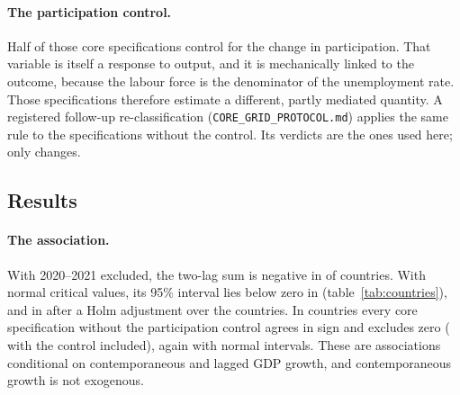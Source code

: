 \paragraph{The participation control.} Half of those core specifications control for the
change in participation. That variable is itself a response to output, and it is
mechanically linked to the outcome, because the labour force is the denominator of the
unemployment rate. Those specifications therefore estimate a different, partly mediated
quantity. A registered follow-up re-classification (\texttt{CORE\_GRID\_PROTOCOL.md}) applies the
same rule to the  specifications without the control. Its verdicts are the
ones used here; only  changes.

\subsection{Results}

\paragraph{The association.} With 2020--2021 excluded, the two-lag sum is negative in
 of  countries. With normal critical values, its
95\% interval lies below zero in  (table~\ref{tab:countries}), and
in  after a Holm adjustment over the  countries. In
 countries every core specification without the participation control
agrees in sign and excludes zero ( with the control included),
again with normal intervals.
These are associations conditional on contemporaneous and lagged GDP growth, and
contemporaneous growth is not exogenous.

